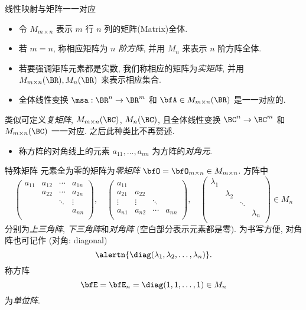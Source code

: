 \begin{frame}{线性映射与矩阵一一对应\noexer}
	\onslide<+->
	\begin{itemize}
		\item 令 $M_{m\times n}$ 表示 $m$ 行 $n$ 列的矩阵(Matrix)全体.
		\item 若 $m=n$, 称相应矩阵为 \emph{$n$ 阶方阵}, 并用 $M_n$ 来表示 $n$ 阶方阵全体.
		\item 若要强调矩阵元素都是实数, 我们称相应的矩阵为\emph{实矩阵}, 并用 $M_{m\times n}(\BR), M_n(\BR)$ 来表示相应集合.
		\item 全体线性变换 $\msa:\BR^n\to\BR^m$ 和 $\bfA\in M_{m\times n}(\BR)$ 是一一对应的.
	\end{itemize}
	\onslide<+->
	类似可定义\emph{复矩阵}, $M_{m\times n}(\BC)$, $M_n(\BC)$, 且全体线性变换 $\BC^n\to\BC^m$ 和 $M_{m\times n}(\BC)$ 一一对应.
	\onslide<+->
	之后此种类比不再赘述.

	\begin{itemize}
		\item 称方阵的对角线上的元素 $a_{11},\dots,a_{nn}$ 为方阵的\emph{对角元}.
	\end{itemize}
\end{frame}


\begin{frame}{特殊矩阵}
	\onslide<+->
	元素全为零的矩阵为\emph{零矩阵} $\bfO=\bfO_{m\times n}\in M_{m\times n}$.
	\onslide<+->
	方阵中
	\[\begin{pmatrix}
		a_{11}&a_{12}&\cdots&a_{1n}\\
		&a_{22}&\cdots&a_{2n}\\
		&&\ddots&\vdots\\
		&&&a_{nn}\\
	\end{pmatrix},\quad\begin{pmatrix}
		a_{11}&&&\\
		a_{21}&a_{22}&&\\
		\vdots&\vdots&\ddots&\\
		a_{n1}&a_{n2}&\cdots&a_{nn}\\
	\end{pmatrix},\quad\begin{pmatrix}
		\lambda_1&&&\\
		&\lambda_2&&\\
		&&\ddots&\\
		&&&\lambda_n\\
	\end{pmatrix}\in M_n\]
	分别为\emph{上三角阵}, \emph{下三角阵}和\emph{对角阵} (空白部分表示元素都是零).
	\onslide<+->
	为书写方便, 对角阵也可记作 (对角: diagonal)
	\[\alertn{\diag(\lambda_1,\lambda_2,\dots,\lambda_n)}.\]
	\onslide<+->
	称方阵
	\[\bfE=\bfE_n=\diag(1,1,\dots,1)\in M_n\]
	为\emph{单位阵}.
\end{frame}



